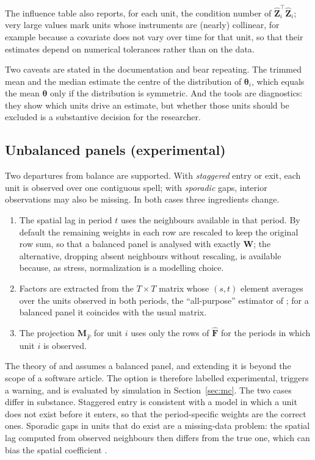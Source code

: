 \documentclass[article]{jss}
\begin{document}
The influence table also reports, for each unit, the condition number of
$\hat{\bm Z}_i^\top\hat{\bm Z}_i$; very large values mark units whose
instruments are (nearly) collinear, for example because a covariate does not
vary over time for that unit, so that their estimates depend on numerical
tolerances rather than on the data.

Two caveats are stated in the documentation and bear repeating. The
trimmed mean and the median estimate the centre of the distribution of
$\bm\theta_i$, which equals the mean $\bm\theta$ only if the distribution is
symmetric. And the tools are diagnostics: they show which units drive an
estimate, but whether those units should be excluded is a substantive
decision for the researcher.

\subsection{Unbalanced panels (experimental)} \label{sec:unbal}

Two departures from balance are supported. With \emph{staggered} entry or
exit, each unit is observed over one contiguous spell; with \emph{sporadic}
gaps, interior observations may also be missing. In both cases three
ingredients change.

\begin{enumerate}
\item The spatial lag in period $t$ uses the neighbours available in that
  period. By default the remaining weights in each row are rescaled to keep
  the original row sum, so that a balanced panel is analysed with exactly
  $\bm W$; the alternative, dropping absent neighbours without rescaling, is
  available because, as \citet{Kelejian+Prucha:2010} stress, normalization
  is a modelling choice.
\item Factors are extracted from the $T\times T$ matrix whose $(s,t)$
  element averages over the units observed in both periods, the
  ``all-purpose'' estimator of \citet{Xiong+Pelger:2023}; for a balanced
  panel it coincides with the usual matrix.
\item The projection $\bm M_{\hat F}$ for unit $i$ uses only the rows of
  $\hat{\bm F}$ for the periods in which unit $i$ is observed.
\end{enumerate}

The theory of \citet{Cui+Sarafidis+Yamagata:2023} and
\citet{Chen+Cui+Sarafidis:2025} assumes a balanced panel, and extending it
is beyond the scope of a software article. The option is therefore labelled
experimental, triggers a warning, and is evaluated by simulation in
Section~\ref{sec:mc}. The two cases differ in substance. Staggered entry is
consistent with a model in which a unit does not exist before it enters, so
that the period-specific weights are the correct ones. Sporadic gaps in
units that do exist are a missing-data problem: the spatial lag computed
from observed neighbours then differs from the true one, which can bias the
spatial coefficient \citep[cf.][]{Wang+Lee:2013}.
\end{document}
